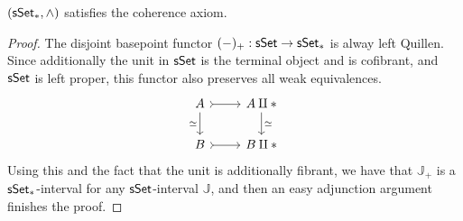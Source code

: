 \documentclass[a4paper,10pt
,draft
]{article}%
\renewcommand{\F}{\mathcal F}
\renewcommand{\1}{\eta}%
\begin{document}
\begin{corollary}
      \label{PTSSETCOH_COR}
      $(\sSet_{\**}, \wedge)$ satisfies the coherence axiom.
\end{corollary}
\begin{proof}
      The disjoint basepoint functor $(-)_+: \sSet \to \sSet_{\**}$ is alway left Quillen.
      Since additionally the unit in $\mathsf{sSet}$ is the terminal object and is cofibrant, and $\mathsf{sSet}$ is left proper,
      this functor also preserves all weak equivalences.
      {\color{OliveGreen} %
        \begin{equation}
              \begin{tikzcd}
                    A \arrow[r, rightarrowtail] \arrow[d, "\simeq"']
                    &
                    A \amalg \** \arrow[d, "\simeq"]
                    \\
                    B \arrow[r, rightarrowtail]
                    &
                    B \amalg \**
              \end{tikzcd}
        \end{equation}
      } %
      Using this and the fact that the unit is additionally fibrant, we have that $\mathbb J_+$ is a $\sSet_{\**}$-interval for any $\mathsf{sSet}$-interval $\mathbb J$,
      and then an easy adjunction argument finishes the proof.
\end{proof}


\end{document}
